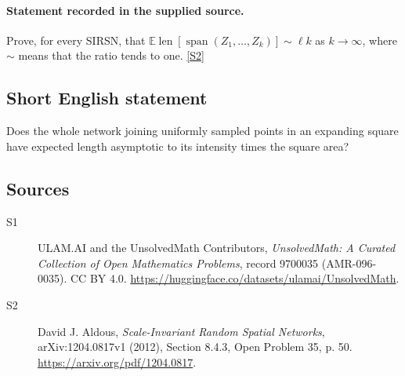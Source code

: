 \documentclass[11pt]{article}
\newcommand{\sref}[2]{\hyperlink{source:#1:#2}{[S#2]}}
\begin{document}
\paragraph{Statement recorded in the supplied source.}
Prove, for every SIRSN, that $\mathbb E\operatorname{len}[\operatorname{span}(Z_1,\ldots,Z_k)]\sim\ell k$ as $k\to\infty$, where $\sim$ means that the ratio tends to one. \sref{9700035}{2}
\subsection{Short English statement}
Does the whole network joining uniformly sampled points in an expanding square have expected length asymptotic to its intensity times the square area?
\subsection{Sources}
\begin{description}
\item[\hypertarget{source:9700035:1}{S1}] ULAM.AI and the UnsolvedMath Contributors, \emph{UnsolvedMath: A Curated Collection of Open Mathematics Problems}, record 9700035 (AMR-096-0035). CC BY 4.0. \url{https://huggingface.co/datasets/ulamai/UnsolvedMath}.
\item[\hypertarget{source:9700035:2}{S2}] David J. Aldous, \emph{Scale-Invariant Random Spatial Networks}, arXiv:1204.0817v1 (2012), Section 8.4.3, Open Problem 35, p. 50. \url{https://arxiv.org/pdf/1204.0817}.
\end{description}
\label{end:9700035}
\end{document}
